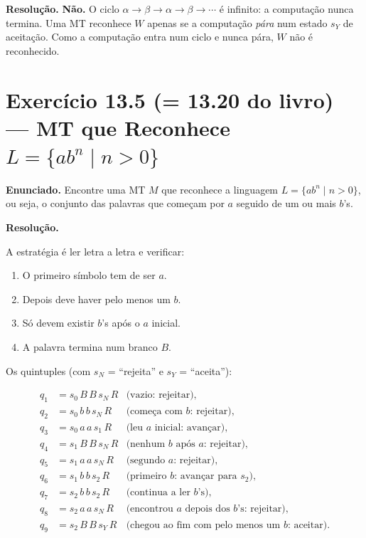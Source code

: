 \documentclass[12pt,a4paper]{article}
\begin{document}
\medskip
\textbf{Resolução.} \textbf{Não.} O ciclo $\alpha \to \beta \to \alpha \to \beta \to \cdots$
é infinito: a computação nunca termina. Uma MT reconhece $W$ apenas se a computação
\emph{pára} num estado $s_Y$ de aceitação. Como a computação entra num ciclo e nunca pára,
$W$ não é reconhecido.

\section*{Exercício 13.5 (= 13.20 do livro) — MT que Reconhece $L = \{ab^n \mid n > 0\}$}

\textbf{Enunciado.} Encontre uma MT $M$ que reconhece a linguagem $L = \{ab^n \mid n > 0\}$,
ou seja, o conjunto das palavras que começam por $a$ seguido de um ou mais $b$'s.

\medskip
\textbf{Resolução.}

A estratégia é ler letra a letra e verificar:
\begin{enumerate}
  \item O primeiro símbolo tem de ser $a$.
  \item Depois deve haver pelo menos um $b$.
  \item Só devem existir $b$'s após o $a$ inicial.
  \item A palavra termina num branco $B$.
\end{enumerate}

Os quintuples (com $s_N$ = ``rejeita'' e $s_Y$ = ``aceita''):

\begin{align*}
  q_1 &= s_0\,B\,B\,s_N\,R &\text{(vazio: rejeitar)},\\
  q_2 &= s_0\,b\,b\,s_N\,R &\text{(começa com } b \text{: rejeitar)},\\
  q_3 &= s_0\,a\,a\,s_1\,R &\text{(leu } a \text{ inicial: avançar)},\\
  q_4 &= s_1\,B\,B\,s_N\,R &\text{(nenhum } b \text{ após } a \text{: rejeitar)},\\
  q_5 &= s_1\,a\,a\,s_N\,R &\text{(segundo } a \text{: rejeitar)},\\
  q_6 &= s_1\,b\,b\,s_2\,R &\text{(primeiro } b \text{: avançar para } s_2\text{)},\\
  q_7 &= s_2\,b\,b\,s_2\,R &\text{(continua a ler } b \text{'s)},\\
  q_8 &= s_2\,a\,a\,s_N\,R &\text{(encontrou } a \text{ depois dos } b\text{'s: rejeitar)},\\
  q_9 &= s_2\,B\,B\,s_Y\,R &\text{(chegou ao fim com pelo menos um } b\text{: aceitar)}.
\end{align*}
\end{document}
